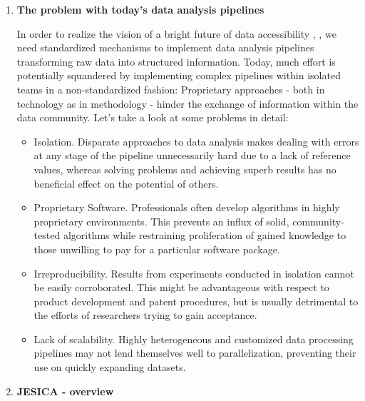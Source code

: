 \documentclass[a4paper,10pt]{article}
\begin{document}
\begin{enumerate}
\item \textbf{The problem with today's data analysis pipelines}

In order to realize the vision of a bright future of data accessibility \citep{Halevy2012}, \citep{GuptaEtAl2013ProgressonHalevy}, we need standardized mechanisms to implement data analysis pipelines transforming raw data into structured information. Today, much effort is potentially squandered by implementing complex pipelines within isolated teams in a non-standardized fashion: Proprietary approaches - both in technology as in methodology - hinder the exchange of information within the data community. Let's take a look at some problems in detail:

\begin{itemize}
 \item Isolation. Disparate approaches to data analysis makes dealing with errors at any stage of the pipeline unnecessarily hard due to a lack of reference values, whereas solving problems and achieving superb results has no beneficial effect on the potential of others.

 \item Proprietary Software. Professionals often develop algorithms in highly proprietary environments. This prevents an influx of solid, community-tested algorithms while restraining proliferation of gained knowledge to those unwilling to pay for a particular software package.

 \item Irreproducibility. Results from experiments conducted in isolation cannot be easily corroborated. This might be advantageous with respect to product development and patent procedures, but is usually detrimental to the efforts of researchers trying to gain acceptance.

 \item Lack of scalability. Highly heterogeneous and customized data processing pipelines may not lend themselves well to parallelization, preventing their use on quickly expanding datasets.
\end{itemize}



\item \textbf{JESICA - overview}


\end{enumerate}
\end{document}
